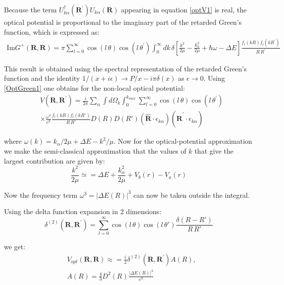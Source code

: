 Because the term $ U_{k\alpha}^{\dagger}(\mathbf{R}^{'})U_{k\alpha}(\mathbf{R}) $ appearing in equation \eqref{optV1} is real, the optical potential is proportional to the imaginary part of the retarded Green's function, which is expressed as:
\begin{equation}\label{OptGreen1}
\begin{split}
\text{Im} G^{+}(\mathbf{R},\mathbf{R}) = \pi\sum_{l=0}^{\infty}{\cos(l\, \theta)\cos(l\,\theta^{'})\int_0^{\infty}{dk\,\delta\left[\frac{k^2}{2\mu} - \frac{k^2_a}{2\mu} + \hbar\omega - \Delta E \right]\frac{f_l(kR)f_l(kR^{'})}{R\,R^{'}} }  }
\end{split}
\end{equation}

This result is obtained using the spectral representation of the retarded Green's function and the identity $ 1/(x + i\epsilon) \rightarrow P/x - i\pi\delta(x) $ as $ \epsilon \rightarrow 0 $. Using \eqref{OptGreen1} one obtains for the non-local optical potential:
\begin{equation}\label{optV2}
\begin{split}
&V(\mathbf{R},\mathbf{R}^{'}) = \frac{i}{2\pi}\sum_{\alpha}\int{d\Omega_k}\int_0^{k_{max}}\sum_{l=0}^{\infty}\cos(l\, \theta)\cos(l\,\theta^{'}) \\[.8em]
&\times\frac{\omega^3}{c^3}\frac{f_l(kR)f_l(kR')}{R\,R'}D(R)D(R')(\hat{\mathbf{R}}\cdot\epsilon_{k\alpha})(\hat{\mathbf{R}}^{'}\cdot\epsilon_{k\alpha})
\end{split}
\end{equation}

where $ \omega(k) = k_{\alpha}/2\mu + \Delta E - k^2/\mu $.  Now for the optical-potential approximation we make the semi-classical approximation that the values of $ k $ that give the largest contribution are given by:
\begin{equation}
\frac{k^2}{2\mu} \simeq = \Delta E + \frac{k_{\alpha}^2}{2\mu} + V_b(r) - V_a(r)
\end{equation}

Now the frequency term $ \omega^3 = \left|\Delta E(R)\right|^3 $ can now be taken outside the integral.

Using the delta function expansion in 2 dimensions: 
\begin{equation}
\delta^{(2)}\left(\mathbf{R},\mathbf{R}^{'}\right) = \sum_{l=0}^{\infty}{\cos(l\,\theta)\cos(l\,\theta')\frac{\delta(R - R')}{R\,R'}}
\end{equation}

we get:
\begin{equation}
\begin{split}
    & V_{opt}(\mathbf{R},\mathbf{R}) \approx = \frac{i}{2}\delta^{(2)}\left(\mathbf{R},\mathbf{R}^{'}\right)A(R), \\[.8em]
& A(R) = \frac{4}{3}D^2(R)\frac{\left|\Delta E(R)\right|^3}{c^3}
\end{split}
\end{equation}

